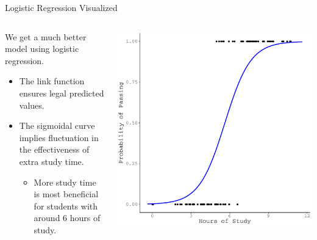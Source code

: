 \documentclass{beamer}\usepackage[]{graphicx}\usepackage[]{color}
\makeatletter
\def\maxwidth{ %
  \ifdim\Gin@nat@width>\linewidth
    \linewidth
  \else
    \Gin@nat@width
  \fi
}
\newenvironment{knitrout}{}{} %
\makeatother
\begin{document}

\begin{frame}{Logistic Regression Visualized}

  \begin{columns}
    \begin{column}{0.5\textwidth}
      
      We get a much better model using logistic regression.
      \vb
      \begin{itemize}
      \item The link function ensures legal predicted values.
        \vb
      \item The sigmoidal curve implies fluctuation in the effectiveness of
        extra study time.  
        \vc
        \begin{itemize}
        \item More study time is most beneficial for students with around 6
          hours of study. 
        \end{itemize}
      \end{itemize}
      
    \end{column}
    
    \begin{column}{0.5\textwidth}
      
\begin{knitrout}\footnotesize
{}\color{fgcolor}

{\centering \includegraphics[width=\maxwidth]{figure/unnamed-chunk-3-1} 

}



\end{knitrout}

\end{column}
\end{columns}
  
\end{frame}
\end{document}
